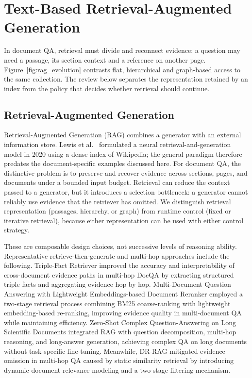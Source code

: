 \section{Text-Based Retrieval-Augmented Generation}
\label{sec:text_rag}

In document QA, retrieval must divide and reconnect evidence: a question may need a passage, its section context and a reference on another page. Figure~\ref{fig:rag_evolution} contrasts flat, hierarchical and graph-based access to the same collection. The review below separates the representation retained by an index from the policy that decides whether retrieval should continue.
\subsection{Retrieval-Augmented Generation}

Retrieval-Augmented Generation (RAG) combines a generator with an external information store. Lewis et al.~\cite{lewis2020rag} formulated a neural retrieval-and-generation model in 2020 using a dense index of Wikipedia; the general paradigm therefore predates the document-specific examples discussed here. For document QA, the distinctive problem is to preserve and recover evidence across sections, pages, and documents under a bounded input budget. Retrieval can reduce the context passed to a generator, but it introduces a selection bottleneck: a generator cannot reliably use evidence that the retriever has omitted. We distinguish retrieval representation (passages, hierarchy, or graph) from runtime control (fixed or iterative retrieval), because either representation can be used with either control strategy.

These are composable design choices, not successive levels of reasoning ability. Representative retrieve-then-generate and multi-hop approaches include the following. Triple-Fact Retriever \cite{wu2022triple} improved the accuracy and interpretability of cross-document evidence paths in multi-hop DocQA by extracting structured triple facts and aggregating evidence hop by hop. Multi-Document Question Answering with Lightweight Embeddings-based Document Reranker \cite{aitymbetov2024multi} employed a two-stage retrieval process combining BM25 coarse-ranking with lightweight embedding-based re-ranking, improving evidence quality in multi-document QA while maintaining efficiency. Zero-Shot Complex Question-Answering on Long Scientific Documents \cite{wang2025zero} integrated RAG with question decomposition, multi-hop reasoning, and long-answer generation, achieving complex QA on long documents without task-specific fine-tuning. Meanwhile, DR-RAG \cite{hei2024dr} mitigated evidence omission in multi-hop QA caused by static similarity retrieval by introducing dynamic document relevance modeling and a two-stage filtering mechanism.

